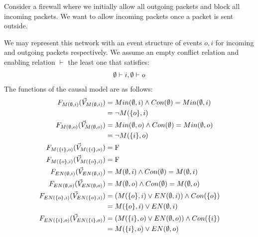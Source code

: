 \begin{example}
    Consider a firewall where we initially allow all outgoing packets and block all incoming packets.
    We want to allow incoming packets once a packet is sent outside.
    \begin{center}
    \end{center}
    We may represent this network with an event structure of
    events $o,i$ for incoming and outgoing packets respectively.
    We assume an empty conflict relation and enabling relation
    $\vdash$ the least one that satisfies:
    \begin{align*}
        \emptyset \vdash i, \emptyset \vdash o
    \end{align*}
    The functions of the causal model are as follows:
    \begin{align*}
        F_{M(\emptyset,i)}(\vec V_{M(\emptyset,i)})    & = Min(\emptyset,i) \wedge Con(\emptyset) = Min(\emptyset,i)   \\
                       & = \neg M(\{o\},i)                        \\
        F_{M(\emptyset,o)}(\vec V_{M(\emptyset,o)})    & = Min(\emptyset,o) \wedge Con(\emptyset) =  Min(\emptyset,o)   \\
                       & = \neg M(\{i\},o) \\
        F_{M(\{i\},o)}(\vec V_{M(\{i\},o)}) & = \mathrm{F}                                     \\
        F_{M(\{o\},i)}(\vec V_{M(\{o\},i)}) & = \mathrm{F}                                     \\
        F_{EN(\emptyset,i)}(\vec V_{EN(\emptyset,i)})    & = M(\emptyset,i) \wedge Con(\emptyset) = M(\emptyset,i)       \\
        F_{EN(\emptyset,o)}(\vec V_{EN(\emptyset,o)})    & = M(\emptyset,o) \wedge Con(\emptyset) = M(\emptyset,o)       \\
        F_{EN(\{o\},i)}(\vec V_{EN(\{o\},i)}) & =
        \left( M(\{o\},i) \vee EN(\emptyset,i)  \right) \wedge Con(\{o\}) \\
                       & = M(\{o\},i) \vee EN(\emptyset,i)                \\
        F_{EN(\{i\},o)}(\vec V_{EN(\{i\},o)}) & =
        \left( M(\{i\},o) \vee EN(\emptyset,o) \right)
        \wedge Con(\{i\})                                         \\
                       & = M(\{i\},o) \vee EN(\emptyset,o)                \\
    \end{align*}

\end{example}
